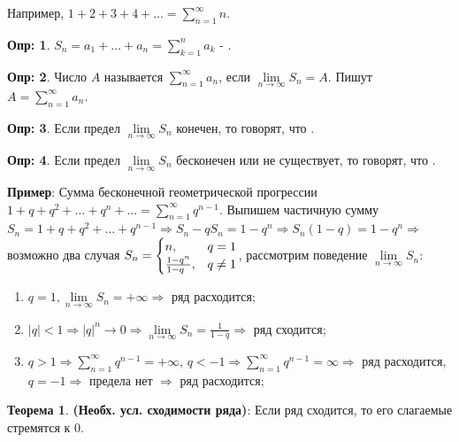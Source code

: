 \documentclass[12pt]{article}
\theoremstyle{definition}
\newtheorem{defn}{Опр:}
\newtheorem{theorem}{Теорема}
\begin{document}
Например, $1 + 2 + 3 + 4 + \dotsc = \displaystyle \sum\limits_{n = 1}^{\infty}n$.

\begin{defn}
	$S_n = a_1 + \dotsc + a_n = \displaystyle \sum\limits_{k = 1}^{n}a_k$ - . 
\end{defn}

\begin{defn}
	Число $A$ называется  $\displaystyle \sum\limits_{n = 1}^{\infty}a_n$, если $\lim\limits_{n\to \infty}S_n = A$. Пишут $A = \displaystyle \sum\limits_{n=1}^{\infty}a_n$.
\end{defn}

\begin{defn}
	Если предел $\lim\limits_{n \to \infty} S_n$ конечен, то говорят, что .
\end{defn}

\begin{defn}
	Если предел $\lim\limits_{n \to \infty} S_n$ бесконечен или не существует, то говорят, что .
\end{defn}

\textbf{Пример}: Сумма бесконечной геометрической прогрессии $1 + q + q^2 + \dotsc + q^n + \dotsc = \displaystyle \sum\limits_{n = 1}^{\infty} q^{n-1}$. Выпишем частичную сумму $S_n = 1 + q + q^2 + \dotsc + q^{n-1} \Rightarrow S_n - qS_n = 1 - q^n \Rightarrow S_n(1-q) = 1-q^n \Rightarrow$ возможно два случая
$
S_n = \begin{cases}
	n, & q = 1 \\
	\frac{1-q^n}{1-q\hfill}, & q \neq 1
\end{cases}
$, рассмотрим поведение $\lim\limits_{n \to \infty} S_n$:

\begin{enumerate}[label={(\arabic*)}]
	\item  $q = 1, \lim\limits_{n \to \infty} S_n = +\infty \Rightarrow$ ряд расходится;
	\item $|q| < 1 \Rightarrow |q|^n \to 0 \Rightarrow \lim\limits_{n \to \infty} S_n = \frac{1}{1-q} \Rightarrow$ ряд сходится;
	\item $q > 1 \Rightarrow \displaystyle \sum\limits_{n = 1}^{\infty}q^{n-1} = +\infty$, $q < -1 \Rightarrow \displaystyle \sum\limits_{n = 1}^{\infty}q^{n-1} = \infty \Rightarrow$ ряд расходится, $q = - 1 \Rightarrow$ предела нет $\Rightarrow$ ряд расходится;
\end{enumerate}

\begin{theorem}\textbf{(Необх. усл. сходимости ряда)}:
	Если ряд сходится, то его слагаемые стремятся к $0$.
\end{theorem}
\end{document}
